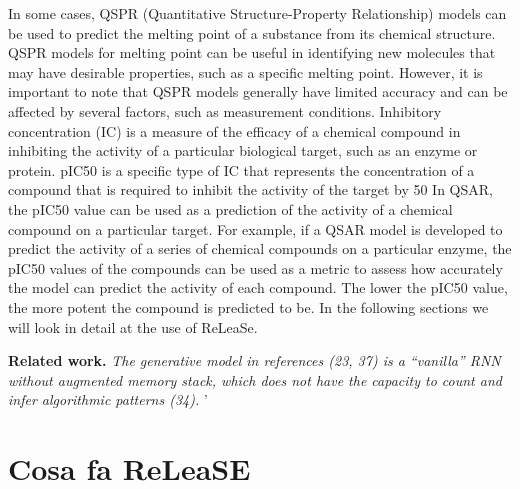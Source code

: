 \documentclass[conference]{IEEEtran}
\newcommand{\mypar}[1]{{\bf #1.}}
\begin{document}
In some cases, QSPR (Quantitative Structure-Property Relationship) models can be used to predict the melting point of a substance from its chemical structure. QSPR models for melting point can be useful in identifying new molecules that may have desirable properties, such as a specific melting point. However, it is important to note that QSPR models generally have limited accuracy and can be affected by several factors, such as measurement conditions.
Inhibitory concentration (IC) is a measure of the efficacy of a chemical compound in inhibiting the activity of a particular biological target, such as an enzyme or protein. pIC50 is a specific type of IC that represents the concentration of a compound that is required to inhibit the activity of the target by 50%
In QSAR, the pIC50 value can be used as a prediction of the activity of a chemical compound on a particular target. For example, if a QSAR model is developed to predict the activity of a series of chemical compounds on a particular enzyme, the pIC50 values of the compounds can be used as a metric to assess how accurately the model can predict the activity of each compound. The lower the pIC50 value, the more potent the compound is predicted to be.
In the following sections we will look in detail at the use of ReLeaSe.

\mypar{Related work} 
\textit{The generative
model in references (23, 37) is a “vanilla” RNN without augmented
memory stack, which does not have the capacity to count and infer
algorithmic patterns (34).
}' \cite{}

\section{Cosa fa ReLeaSE}\label{sec:Cosa fa ReLeaSE}
\end{document}
